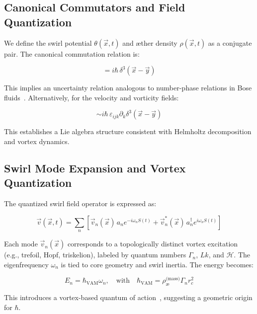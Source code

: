 \documentclass[preprint]{revtex4-2}
\begin{document}
    \subsection{Canonical Commutators and Field Quantization}
    We define the swirl potential \( \theta(\vec{x}, t) \) and æther density \( \rho(\vec{x}, t) \) as a conjugate pair. The canonical commutation relation is:

    \begin{equation}
    [\theta(\vec{x}), \rho(\vec{y})] = i\hbar\,\delta^3(\vec{x} - \vec{y})
    \label{eq:canonical_commutator}
    \end{equation}

    This implies an uncertainty relation analogous to number-phase relations in Bose fluids~\cite{volovik2003universe}. Alternatively, for the velocity and vorticity fields:

    \begin{equation}
    [v_i(\vec{x}), \omega_j(\vec{y})] \sim i\hbar\,\varepsilon_{ijk} \partial_k \delta^3(\vec{x} - \vec{y})
    \end{equation}

    This establishes a Lie algebra structure consistent with Helmholtz decomposition and vortex dynamics.

    \subsection{Swirl Mode Expansion and Vortex Quantization}
    The quantized swirl field operator is expressed as:

    \begin{equation}
    \vec{v}(\vec{x}, t) = \sum_n \left[ \vec{v}_n(\vec{x})\, a_n e^{-i\omega_n S(t)} + \vec{v}_n^*(\vec{x})\, a_n^\dagger e^{i\omega_n S(t)} \right]
    \end{equation}

    Each mode \( \vec{v}_n(\vec{x}) \) corresponds to a topologically distinct vortex excitation (e.g., trefoil, Hopf, triskelion), labeled by quantum numbers \( \Gamma_n \), \( Lk \), and \( \mathcal{H} \). The eigenfrequency \( \omega_n \) is tied to core geometry and swirl inertia. The energy becomes:

    \begin{equation}
    E_n = \hbar_{\text{VAM}} \omega_n, \quad \text{with} \quad \hbar_{\text{VAM}} = \rho_{\text{\ae}}^{\text{(mass)}} \Gamma_n r_c^2
    \end{equation}

    This introduces a vortex-based quantum of action~\cite{ranada1992knots}, suggesting a geometric origin for \( \hbar \).
\end{document}
